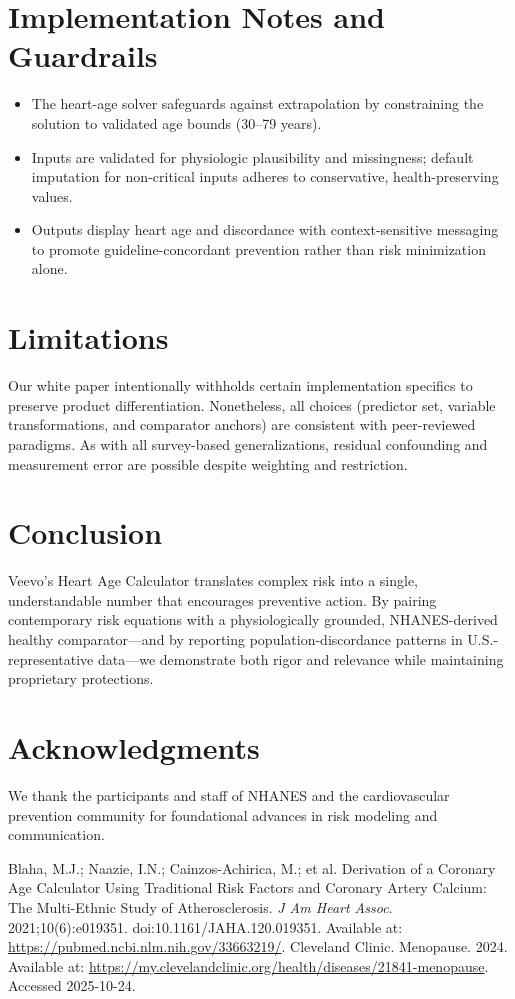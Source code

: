 \documentclass{article}
\begin{document}
\section{Implementation Notes and Guardrails}
\begin{itemize}
  \item The heart-age solver safeguards against extrapolation by constraining the solution to validated age bounds (30--79 years).
  \item Inputs are validated for physiologic plausibility and missingness; default imputation for non-critical inputs adheres to conservative, health-preserving values.
  \item Outputs display heart age and discordance with context-sensitive messaging to promote guideline-concordant prevention rather than risk minimization alone.
\end{itemize}

\section{Limitations}
Our white paper intentionally withholds certain implementation specifics to preserve product differentiation. Nonetheless, all choices (predictor set, variable transformations, and comparator anchors) are consistent with peer-reviewed paradigms. As with all survey-based generalizations, residual confounding and measurement error are possible despite weighting and restriction.

\section{Conclusion}
Veevo's Heart Age Calculator translates complex risk into a single, understandable number that encourages preventive action. By pairing contemporary risk equations with a physiologically grounded, NHANES-derived healthy comparator---and by reporting population-discordance patterns in U.S.-representative data---we demonstrate both rigor and relevance while maintaining proprietary protections.

\section*{Acknowledgments}
We thank the participants and staff of NHANES and the cardiovascular prevention community for foundational advances in risk modeling and communication.

\begin{thebibliography}{9}
 Blaha, M.J.; Naazie, I.N.; Cainzos-Achirica, M.; et al. Derivation of a Coronary Age Calculator Using Traditional Risk Factors and Coronary Artery Calcium: The Multi-Ethnic Study of Atherosclerosis. \emph{J Am Heart Assoc}. 2021;10(6):e019351. doi:10.1161/JAHA.120.019351. Available at: \url{https://pubmed.ncbi.nlm.nih.gov/33663219/}.
 Cleveland Clinic. Menopause. 2024. Available at: \url{https://my.clevelandclinic.org/health/diseases/21841-menopause}. Accessed 2025-10-24.
\end{thebibliography}
\end{document}
